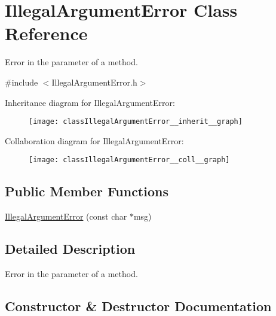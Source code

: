 \hypertarget{classIllegalArgumentError}{}\section{Illegal\+Argument\+Error Class Reference}
\label{classIllegalArgumentError}


Error in the parameter of a method.  




{\ttfamily \#include $<$Illegal\+Argument\+Error.\+h$>$}



Inheritance diagram for Illegal\+Argument\+Error\+:\nopagebreak
\begin{figure}[H]
\begin{center}
\leavevmode
\texttt{[image: classIllegalArgumentError\_\_inherit\_\_graph]}
\end{center}
\end{figure}


Collaboration diagram for Illegal\+Argument\+Error\+:\nopagebreak
\begin{figure}[H]
\begin{center}
\leavevmode
\texttt{[image: classIllegalArgumentError\_\_coll\_\_graph]}
\end{center}
\end{figure}
\subsection*{Public Member Functions}
\begin{DoxyCompactItemize}
\item 
\hyperlink{classIllegalArgumentError_aec2c76d99f790765a78e3d4fa109055a}{Illegal\+Argument\+Error} (const char $\ast$msg)
\end{DoxyCompactItemize}


\subsection{Detailed Description}
Error in the parameter of a method. 

\subsection{Constructor \& Destructor Documentation}
\hypertarget{classIllegalArgumentError_aec2c76d99f790765a78e3d4fa109055a}{}
